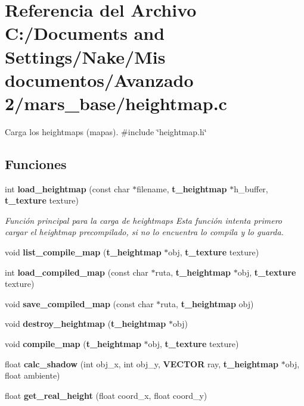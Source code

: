 \section{Referencia del Archivo C:/Documents and Settings/Nake/Mis documentos/Avanzado 2/mars\_\-base/heightmap.c}
\label{heightmap_8c}


Carga los heightmaps (mapas).  
{\ttfamily \#include \char`\"{}heightmap.h\char`\"{}}\par
\subsection*{Funciones}
\begin{DoxyCompactItemize}
\item 
int {\bf load\_\-heightmap} (const char $\ast$filename, {\bf t\_\-heightmap} $\ast$h\_\-buffer, {\bf t\_\-texture} texture)
\begin{DoxyCompactList}\small\item\em Función principal para la carga de heightmaps Esta función intenta primero cargar el heightmap precompilado, si no lo encuentra lo compila y lo guarda. \item\end{DoxyCompactList}\item 
void {\bfseries list\_\-compile\_\-map} ({\bf t\_\-heightmap} $\ast$obj, {\bf t\_\-texture} texture)\label{heightmap_8c_ad85161fbb63b928eaabb16f0f3275683}

\item 
int {\bfseries load\_\-compiled\_\-map} (const char $\ast$ruta, {\bf t\_\-heightmap} $\ast$obj, {\bf t\_\-texture} texture)\label{heightmap_8c_a02c72f16c50a4499ae51a664bd02e9a3}

\item 
void {\bfseries save\_\-compiled\_\-map} (const char $\ast$ruta, {\bf t\_\-heightmap} obj)\label{heightmap_8c_a0ea2caf90742c16e0a103f91668bb359}

\item 
void {\bfseries destroy\_\-heightmap} ({\bf t\_\-heightmap} $\ast$obj)\label{heightmap_8c_a96fef409bbc870002703c7a55d2591c9}

\item 
void {\bfseries compile\_\-map} ({\bf t\_\-heightmap} $\ast$obj, {\bf t\_\-texture} texture)\label{heightmap_8c_ac95a5ca74fe1123edc7e88fe2b4c1cd0}

\item 
float {\bfseries calc\_\-shadow} (int obj\_\-x, int obj\_\-y, {\bf VECTOR} ray, {\bf t\_\-heightmap} $\ast$obj, float ambiente)\label{heightmap_8c_a752b82b3bd6b16cbfac7ac591bacdbc1}

\item 
float {\bfseries get\_\-real\_\-height} (float coord\_\-x, float coord\_\-y)\label{heightmap_8c_ac853e2c0c9e5c2c52b7d948d0fab7fb7}

\end{DoxyCompactItemize}


